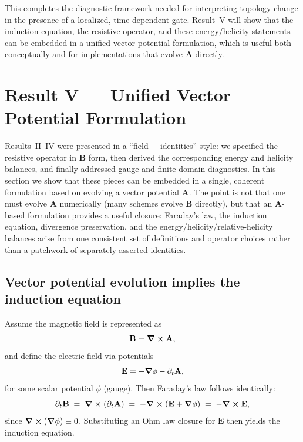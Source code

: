 \documentclass[11pt]{article}
\theoremstyle{plain}
\theoremstyle{definition}
\theoremstyle{remark}
\newcommand{\A}{\mathbf{A}}
\newcommand{\B}{\mathbf{B}}
\newcommand{\E}{\mathbf{E}}
\begin{document}
This completes the diagnostic framework needed for interpreting topology change in the presence of a
localized, time-dependent gate. Result~V will show that the induction equation, the resistive operator,
and these energy/helicity statements can be embedded in a unified vector-potential formulation, which
is useful both conceptually and for implementations that evolve $\A$ directly.

\section{Result V --- Unified Vector Potential Formulation}\label{sec:result_Aform}

Results~II--IV were presented in a ``field + identities'' style: we specified the resistive operator in
$\B$ form, then derived the corresponding energy and helicity balances, and finally addressed gauge and
finite-domain diagnostics. In this section we show that these pieces can be embedded in a single,
coherent formulation based on evolving a vector potential $\A$. The point is not that one must evolve
$\A$ numerically (many schemes evolve $\B$ directly), but that an $\A$-based formulation provides a
useful closure: Faraday's law, the induction equation, divergence preservation, and the
energy/helicity/relative-helicity balances arise from one consistent set of definitions and operator
choices rather than a patchwork of separately asserted identities.

\subsection{Vector potential evolution implies the induction equation}\label{sec:result_Aform_induction}
Assume the magnetic field is represented as
\begin{equation}\label{eq:B_from_A_R5}
  \B = \curl\A,
\end{equation}
and define the electric field via potentials
\begin{equation}\label{eq:E_from_potentials_R5}
  \E = -\grad\phi - \partial_t\A,
\end{equation}
for some scalar potential $\phi$ (gauge). Then Faraday's law follows identically:
\begin{equation}\label{eq:faraday_from_A}
  \partial_t\B
  \;=\;
  \curl(\partial_t\A)
  \;=\;
  -\curl(\E+\grad\phi)
  \;=\;
  -\curl\E,
\end{equation}
since $\curl(\grad\phi)\equiv 0$. Substituting an Ohm law closure for $\E$ then yields the induction
equation.
\end{document}
